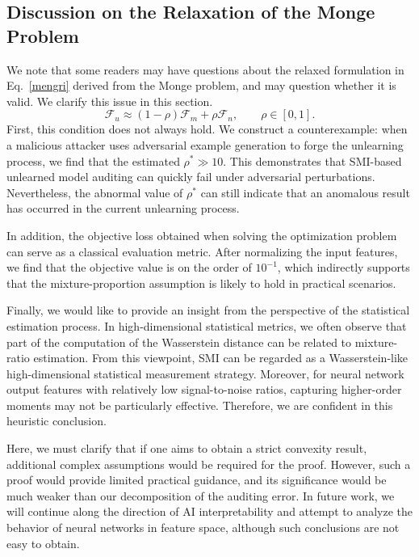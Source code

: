 \documentclass{article}
\theoremstyle{plain}
\theoremstyle{definition}
\theoremstyle{remark}
\begin{document}
\subsection{Discussion on the Relaxation of the Monge Problem}\label{diss}
We note that some readers may have questions about the relaxed formulation in Eq.~\eqref{mengri} derived from the Monge problem, and may question whether it is valid. We clarify this issue in this section.
\begin{equation}
    \mathcal F_u
    \approx
    (1-\rho)\mathcal F_m+\rho\mathcal F_n,
    \qquad \rho\in[0,1]. \label{mengri}
\end{equation}
First, this condition does not always hold. We construct a counterexample: when a malicious attacker uses adversarial example generation to forge the unlearning process, we find that the estimated $\rho^* \gg 10$. This demonstrates that SMI-based unlearned model auditing can quickly fail under adversarial perturbations. Nevertheless, the abnormal value of $\rho^*$ can still indicate that an anomalous result has occurred in the current unlearning process.

In addition, the objective loss obtained when solving the optimization problem can serve as a classical evaluation metric. After normalizing the input features, we find that the objective value is on the order of $10^{-1}$, which indirectly supports that the mixture-proportion assumption is likely to hold in practical scenarios.

Finally, we would like to provide an insight from the perspective of the statistical estimation process. In high-dimensional statistical metrics, we often observe that part of the computation of the Wasserstein distance can be related to mixture-ratio estimation. From this viewpoint, SMI can be regarded as a Wasserstein-like high-dimensional statistical measurement strategy. Moreover, for neural network output features with relatively low signal-to-noise ratios, capturing higher-order moments may not be particularly effective. Therefore, we are confident in this heuristic conclusion.

Here, we must clarify that if one aims to obtain a strict convexity result, additional complex assumptions would be required for the proof. However, such a proof would provide limited practical guidance, and its significance would be much weaker than our decomposition of the auditing error. In future work, we will continue along the direction of AI interpretability and attempt to analyze the behavior of neural networks in feature space, although such conclusions are not easy to obtain.
\end{document}
